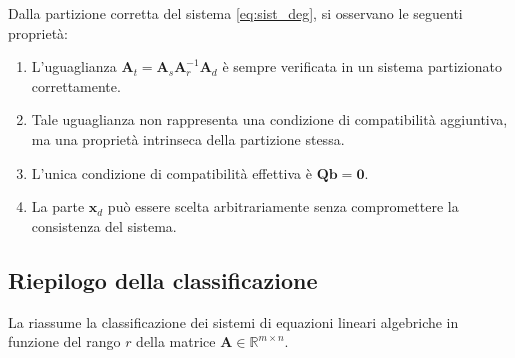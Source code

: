 \begin{oss}
	Dalla partizione corretta del sistema \eqref{eq:sist_deg}, si osservano le seguenti proprietà:
	\begin{enumerate}
		\item L'uguaglianza $\bm{A}_t = \bm{A}_s \bm{A}_r^{-1} \bm{A}_d$ è sempre verificata in un sistema partizionato correttamente.
		\item Tale uguaglianza non rappresenta una condizione di compatibilità aggiuntiva, ma una proprietà intrinseca della partizione stessa.
		\item L'unica condizione di compatibilità effettiva è $\bm{Q} \bm{b} = \bm{0}$.
		\item La parte $\bm{x}_d$ può essere scelta arbitrariamente senza compromettere la consistenza del sistema.
	\end{enumerate}
\end{oss}


\subsection{Riepilogo della classificazione}

La  riassume la	classificazione dei sistemi di equazioni lineari algebriche	in funzione del rango $r$ della matrice	$\bm{A} \in \mathbb{R}^{m \times n}$.



\begin{table}[ht]
	\centering
	\small
	\renewcommand{\arraystretch}{1.4}
	\caption{Classificazione dei sistemi lineari $\bm{A}\bm{x}=\bm{b}$.}
\label{tab:classificazione_eqlineari}
\end{table}



